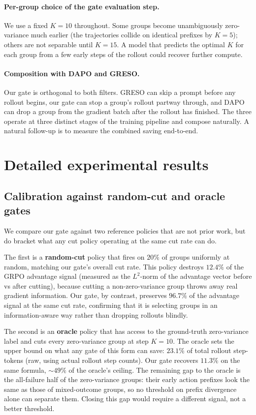 \documentclass{article}
\begin{document}
\paragraph{Per-group choice of the gate evaluation step.}
We use a fixed $K = 10$ throughout. Some groups become
unambiguously zero-variance much earlier (the trajectories collide
on identical prefixes by $K = 5$); others are not separable until
$K = 15$. A model that predicts the optimal $K$ for each group
from a few early steps of the rollout could recover further
compute.

\paragraph{Composition with DAPO and GRESO.}
Our gate is orthogonal to both filters. GRESO can skip a prompt
before any rollout begins, our gate can stop a group's rollout
partway through, and DAPO can drop a group from the gradient
batch after the rollout has finished. The three operate at three
distinct stages of the training pipeline and compose naturally.
A natural follow-up is to measure the combined saving end-to-end.


\section{Detailed experimental results}
\label{app:results_extended}

\subsection{Calibration against random-cut and oracle gates}
\label{app:calibration}

We compare our gate against two reference policies that are not
prior work, but do bracket what any cut policy operating at the
same cut rate can do.

The first is a \textbf{random-cut} policy that fires on $20\%$ of
groups uniformly at random, matching our gate's overall cut rate.
This policy destroys $12.4\%$ of the GRPO advantage signal
(measured as the $L^2$-norm of the advantage vector before vs
after cutting), because cutting a non-zero-variance group throws
away real gradient information. Our gate, by contrast, preserves
$96.7\%$ of the advantage signal at the same cut rate, confirming
that it is selecting groups in an information-aware way rather
than dropping rollouts blindly.

The second is an \textbf{oracle} policy that has access to the
ground-truth zero-variance label and cuts every zero-variance
group at step $K\!=\!10$. The oracle sets the upper bound on what
any gate of this form can save: $23.1\%$ of total rollout
step-tokens (raw, using actual rollout step counts). Our gate
recovers $11.3\%$ on the same formula, $\sim\!49\%$ of the
oracle's ceiling. The remaining gap to the oracle is the
all-failure half of the zero-variance groups: their early action
prefixes look the same as those of mixed-outcome groups, so no
threshold on prefix divergence alone can separate them. Closing
this gap would require a different signal, not a better
threshold.
\end{document}
